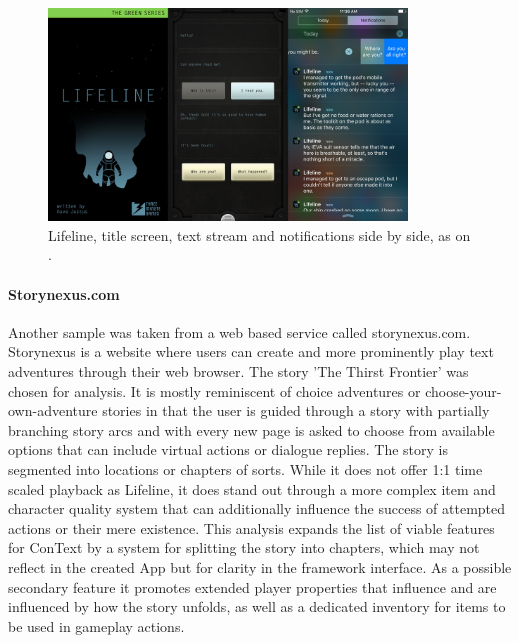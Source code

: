 \begin{figure}[!h]
\centering
\includegraphics[width=0.85\textwidth]{figures/lifeline.png}
\caption[Lifeline (iOS)]{Lifeline, title screen, text stream and notifications side by side, as on \cite{LIFEiOS}.}\label{fig:lifeline}
\end{figure}

\paragraph{Storynexus.com} 
Another sample was taken from a web based service called storynexus.com. Storynexus is a website where users can create and more prominently play text adventures through their web browser. The story 'The Thirst Frontier' was chosen for analysis. It is mostly reminiscent of choice adventures or choose-your-own-adventure stories in that the user is guided through a story with partially branching story arcs and with every new page is asked to choose from available options that can include virtual actions or dialogue replies. The story is segmented into locations or chapters of sorts. While it does not offer 1:1 time scaled playback as Lifeline, it does stand out through a more complex item and character quality system that can additionally influence the success of attempted actions or their mere existence. 
This analysis expands the list of viable features for ConText by a system for splitting the story into chapters, which may not reflect in the created App but for clarity in the framework interface. As a possible secondary feature it promotes extended player properties that influence and are influenced by how the story unfolds, as well as a dedicated inventory for items to be used in gameplay actions. \cite{SNEXUS}\cite{SNEXTTF}

